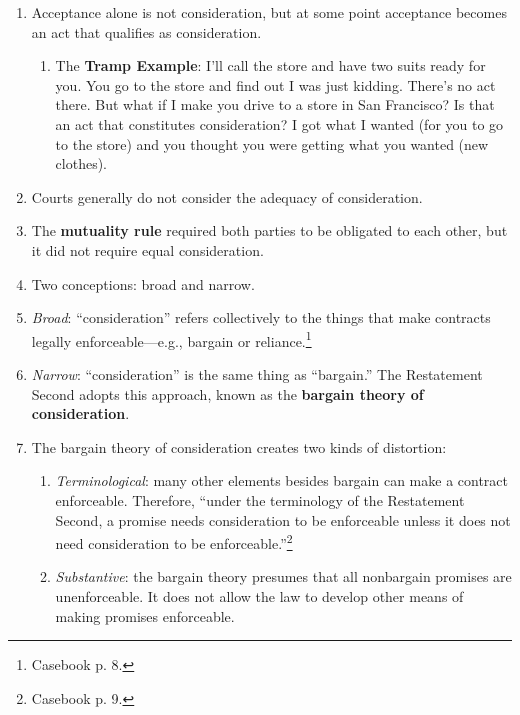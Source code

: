 \begin{enumerate}
    \item Acceptance alone is not consideration, but at some point acceptance 
    becomes an act that qualifies as consideration.
    \begin{enumerate}
        \item The \textbf{Tramp Example}: I'll call the store and have two 
        suits ready for you. You go to the store and find out I was just 
        kidding.  There's no act there. But what if I make you drive to a 
        store in San Francisco? Is that an act that constitutes consideration? 
        I got what I wanted (for you to go to the store) and you thought you 
        were getting what you wanted (new clothes).
    \end{enumerate}
    \item Courts generally do not consider the adequacy of consideration.
    \item The \textbf{mutuality rule} required both parties to be obligated to 
    each other, but it did not require equal consideration.
    \item Two conceptions: broad and narrow.
    \item \emph{Broad}: ``consideration'' refers collectively to the things 
    that make contracts legally enforceable---e.g., bargain or 
    reliance.\footnote{Casebook p. 8.}
    \item \emph{Narrow}: ``consideration'' is the same thing as ``bargain.'' 
    The Restatement Second adopts this approach, known as the \textbf{bargain 
    theory of consideration}.
    \item The bargain theory of consideration creates two kinds of distortion:
    \begin{enumerate}
        \item \emph{Terminological}: many other elements besides bargain can 
        make a contract enforceable. Therefore, ``under the terminology of the 
        Restatement Second, a promise needs consideration to be enforceable 
        unless it does not need consideration to be 
        enforceable.''\footnote{Casebook p. 9.}
        \item \emph{Substantive}: the bargain theory presumes that all 
        nonbargain promises are unenforceable. It does not allow the law to 
        develop other means of making promises enforceable.
    \end{enumerate}
\end{enumerate}


